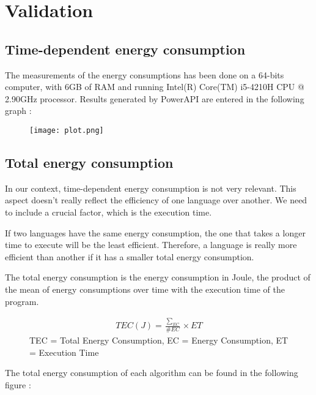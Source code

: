 \section{Validation}
\label{sec:Validation}
	\subsection{Time-dependent energy consumption}
	The measurements of the energy consumptions has been done on a 64-bits computer, with 6GB of RAM and running Intel(R) Core(TM) i5-4210H CPU @ 2.90GHz processor. Results generated by PowerAPI are entered in the following graph :
\begin{figure}[H]
	\texttt{[image: plot.png]}
\end{figure}

	\subsection{Total energy consumption}
	In our context, time-dependent energy consumption is not very relevant. This aspect doesn't really reflect the efficiency of one language over another. We need to include a crucial factor, which is the execution time.
	
	If two languages have the same energy consumption, the one that takes a longer time to execute will be the least efficient. Therefore, a language is really more efficient than another if it has a smaller total energy consumption.
	
	The total energy consumption is the energy consumption in Joule, the product of the mean of energy consumptions over time with the execution time of the program. \cite{joule}
	
	\begin{figure}[H]
	\begin{gather*}
		TEC(J) = \frac{\sum\nolimits_{EC}}{\#EC} \times ET	
	\end{gather*}
	TEC = Total Energy Consumption, EC = Energy Consumption, ET = Execution Time
	\end{figure}
	
The total energy consumption of each algorithm can be found in the following figure :

